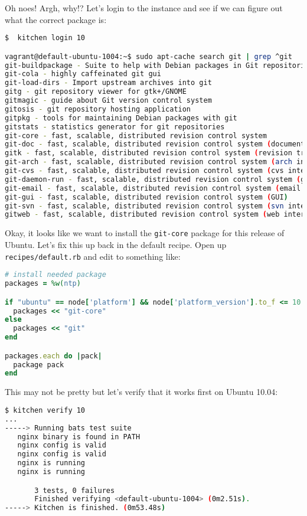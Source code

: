 Oh noes! Argh, why!? Let's login to the instance and see if we can figure out what the correct package is:

\begin{lstlisting}[language=Bash,label=lst:testing-test-kitchen29]
$  kitchen login 10

vagrant@default-ubuntu-1004:~$ sudo apt-cache search git | grep ^git
git-buildpackage - Suite to help with Debian packages in Git repositories
git-cola - highly caffeinated git gui
git-load-dirs - Import upstream archives into git
gitg - git repository viewer for gtk+/GNOME
gitmagic - guide about Git version control system
gitosis - git repository hosting application
gitpkg - tools for maintaining Debian packages with git
gitstats - statistics generator for git repositories
git-core - fast, scalable, distributed revision control system
git-doc - fast, scalable, distributed revision control system (documentation)
gitk - fast, scalable, distributed revision control system (revision tree visualizer)
git-arch - fast, scalable, distributed revision control system (arch interoperability)
git-cvs - fast, scalable, distributed revision control system (cvs interoperability)
git-daemon-run - fast, scalable, distributed revision control system (git-daemon service)
git-email - fast, scalable, distributed revision control system (email add-on)
git-gui - fast, scalable, distributed revision control system (GUI)
git-svn - fast, scalable, distributed revision control system (svn interoperability)
gitweb - fast, scalable, distributed revision control system (web interface)
\end{lstlisting}

Okay, it looks like we want to install the \lstinline!git-core! package for this release of Ubuntu. Let's fix this up back in the default recipe. Open up \lstinline!recipes/default.rb! and edit to something like:

\begin{lstlisting}[language=Ruby,label=lst:testing-test-kitchen30]
# install needed package
packages = %w(ntp)

if "ubuntu" == node['platform'] && node['platform_version'].to_f <= 10.04
  packages << "git-core"
else
  packages << "git"
end

packages.each do |pack|
  package pack
end
\end{lstlisting}

This may not be pretty but let's verify that it works first on Ubuntu 10.04:

\begin{lstlisting}[language=Bash,label=lst:testing-test-kitchen31]
$ kitchen verify 10
...
-----> Running bats test suite
   nginx binary is found in PATH
   nginx config is valid                                                    2/3
   nginx config is valid
   nginx is running                                                         3/3
   nginx is running

       3 tests, 0 failures
       Finished verifying <default-ubuntu-1004> (0m2.51s).
-----> Kitchen is finished. (0m53.48s)
\end{lstlisting}

